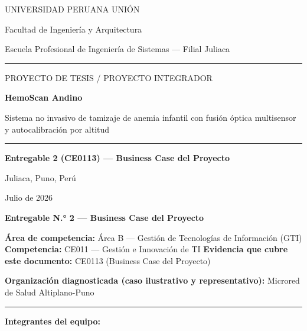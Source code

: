 \documentclass[11pt,a4paper]{article}
\begin{document}
\begin{titlepage}
\centering
\vspace*{1.2cm}
{\large UNIVERSIDAD PERUANA UNI\'ON\par}
{\normalsize Facultad de Ingenier\'ia y Arquitectura\par}
{\normalsize Escuela Profesional de Ingenier\'ia de Sistemas --- Filial Juliaca\par}
\vspace{0.5cm}
\rule{0.6\linewidth}{0.4pt}
\vspace{1.6cm}

{\large PROYECTO DE TESIS / PROYECTO INTEGRADOR\par}
\vspace{1.0cm}
{\huge\bfseries HemoScan Andino\par}
\vspace{0.6cm}
{\Large Sistema no invasivo de tamizaje de anemia infantil con fusi\'on \'optica multisensor y autocalibraci\'on por altitud\par}
\vspace{1.6cm}
\rule{0.6\linewidth}{0.4pt}
\vspace{1.6cm}

{\Large\bfseries Entregable 2 (CE0113) --- Business Case del Proyecto\par}
\vspace{2.0cm}

{\normalsize Juliaca, Puno, Per\'u \par}
{\normalsize Julio de 2026\par}

\vfill
\end{titlepage}

\tableofcontents
\newpage

\textbf{Entregable N.° 2 --- Business Case del Proyecto}

\textbf{Área de competencia:} Área B --- Gestión de Tecnologías de Información (GTI)
\textbf{Competencia:} CE011 --- Gestión e Innovación de TI
\textbf{Evidencia que cubre este documento:} CE0113 (Business Case del Proyecto)

\textbf{Organización diagnosticada (caso ilustrativo y representativo):} Microred de Salud Altiplano-Puno

\begin{center}\rule{0.5\linewidth}{0.5pt}\end{center}

\textbf{Integrantes del equipo:}
\end{document}

